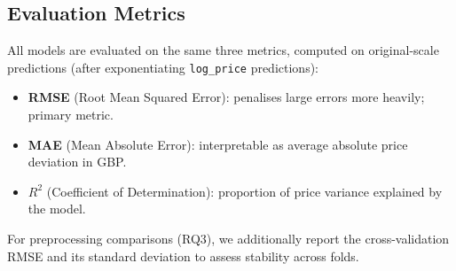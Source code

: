 \subsection{Evaluation Metrics}
\label{sec:metrics}

All models are evaluated on the same three metrics, computed on original-scale predictions (after exponentiating \texttt{log\_price} predictions):
\begin{itemize}
  \item \textbf{RMSE} (Root Mean Squared Error): penalises large errors more heavily; primary metric.
  \item \textbf{MAE} (Mean Absolute Error): interpretable as average absolute price deviation in GBP.
  \item \textbf{$R^2$} (Coefficient of Determination): proportion of price variance explained by the model.
\end{itemize}

For preprocessing comparisons (RQ3), we additionally report the cross-validation RMSE and its standard deviation to assess stability across folds.
